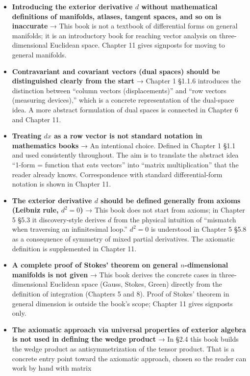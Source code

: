 \documentclass[a4paper,12pt,openany]{book}
\begin{document}
\begin{itemize}
\item
  \textbf{Introducing the exterior derivative $d$ without mathematical definitions of manifolds, atlases, tangent spaces, and so on is inaccurate}
  → This book is not a textbook of differential forms on general
  manifolds; it is an introductory book for reaching vector analysis on
  three-dimensional Euclidean space. Chapter 11 gives signposts for
  moving to general manifolds.
\item
  \textbf{Contravariant and covariant vectors (dual spaces) should be distinguished clearly from the start}
  → Chapter 1 §1.1.6 introduces the distinction between ``column vectors
  (displacements)'' and ``row vectors (measuring devices),'' which is a
  concrete representation of the dual-space idea. A more abstract
  formulation of dual spaces is connected in Chapter 6 and Chapter 11.
\item
  \textbf{Treating $dx$ as a row vector is not standard notation in mathematics books}
  → An intentional choice. Defined in Chapter 1 §1.1 and used
  consistently throughout. The aim is to translate the abstract idea
  ``1-form = function that eats vectors'' into ``matrix multiplication''
  that the reader already knows. Correspondence with standard
  differential-form notation is shown in Chapter 11.
\item
  \textbf{The exterior derivative $d$ should be defined generally from axioms (Leibniz rule, $d^2=0$)}
  → This book does not start from axioms; in Chapter 5 §5.3 it
  discovery-style derives \(d\) from the physical intuition of
  ``mismatch when traversing an infinitesimal loop.'' \(d^2=0\) is
  understood in Chapter 5 §5.8 as a consequence of symmetry of mixed
  partial derivatives. The axiomatic definition is supplemented in
  Chapter 11.
\item
  \textbf{A complete proof of Stokes' theorem on general $n$-dimensional manifolds is not given}
  → This book derives the concrete cases in three-dimensional Euclidean
  space (Gauss, Stokes, Green) directly from the definition of
  integration (Chapters 5 and 8). Proof of Stokes' theorem in general
  dimension is outside the book's scope; Chapter 11 gives signposts
  only.
\item
  \textbf{The axiomatic approach via universal properties of exterior algebra is not used in defining the wedge product}
  → In §2.4 this book builds the wedge product as antisymmetrization of
  the tensor product. That is a concrete entry point toward the
  axiomatic approach, chosen so the reader can work by hand with matrix

\end{itemize}
\end{document}
